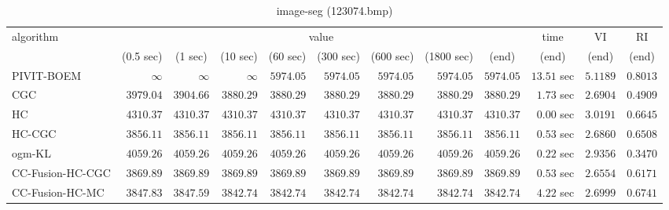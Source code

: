 \begin{table}[H]
\scriptsize
\centering
\caption{image-seg (123074.bmp)}
\label{tab:anytimetable-image-seg-123074.bmp}
\begin{tabular}{lrrrrrrrrrrr}
\toprule
           algorithm &                                   \multicolumn{8}{c}{value} & \multicolumn{1}{c}{time}    & \multicolumn{1}{c}{VI}  & \multicolumn{1}{c}{RI} \\  
\cmidrule(lr){2-9}\cmidrule(lr){10-10} \cmidrule(lr){11-11} \cmidrule(lr){12-12}   
                     & \multicolumn{1}{c}{(0.5 sec)} & \multicolumn{1}{c}{(1 sec)} & \multicolumn{1}{c}{(10 sec)} & \multicolumn{1}{c}{(60 sec)} & \multicolumn{1}{c}{(300 sec)} & \multicolumn{1}{c}{(600 sec)} & \multicolumn{1}{c}{(1800 sec)} & \multicolumn{1}{c}{(end)} & \multicolumn{1}{c}{(end)}    & \multicolumn{1}{c}{(end)}   & \multicolumn{1}{c}{(end)}  \\ \midrule 
          PIVIT-BOEM & $\infty$ & $\infty$ & $\infty$ & $      5974.05$ & $      5974.05$ & $      5974.05$ & $      5974.05$ & $      5974.05$ & $        13.51$ sec    & $       5.1189$  & $       0.8013$ \\ 
                 CGC & $      3979.04$ & $      3904.66$ & $      3880.29$ & $      3880.29$ & $      3880.29$ & $      3880.29$ & $      3880.29$ & $      3880.29$ & $         1.73$ sec    & $       2.6904$  & $       0.4909$ \\ 
                  HC & $      4310.37$ & $      4310.37$ & $      4310.37$ & $      4310.37$ & $      4310.37$ & $      4310.37$ & $      4310.37$ & $      4310.37$ & $         0.00$ sec    & $       3.0191$  & $       0.6645$ \\ 
              HC-CGC & $      3856.11$ & $      3856.11$ & $      3856.11$ & $      3856.11$ & $      3856.11$ & $      3856.11$ & $      3856.11$ & $      3856.11$ & $         0.53$ sec    & $       2.6860$  & $       0.6508$ \\ 
              ogm-KL & $      4059.26$ & $      4059.26$ & $      4059.26$ & $      4059.26$ & $      4059.26$ & $      4059.26$ & $      4059.26$ & $      4059.26$ & $         0.22$ sec    & $       2.9356$  & $       0.3470$ \\ 
    CC-Fusion-HC-CGC & $      3869.89$ & $      3869.89$ & $      3869.89$ & $      3869.89$ & $      3869.89$ & $      3869.89$ & $      3869.89$ & $      3869.89$ & $         0.53$ sec    & $       2.6554$  & $       0.6171$ \\ 
     CC-Fusion-HC-MC & $      3847.83$ & $      3847.59$ & $      3842.74$ & $      3842.74$ & $      3842.74$ & $      3842.74$ & $      3842.74$ & $      3842.74$ & $         4.22$ sec    & $       2.6999$  & $       0.6741$ \\ 

\end{tabular}
\end{table}
